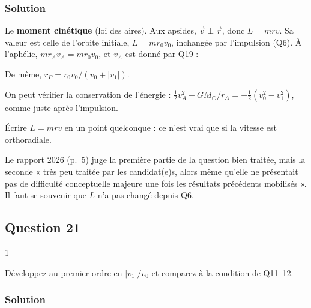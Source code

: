\documentclass[11pt,a4paper]{article}
\newcommand{\equationajustee}[1]{%
  \sbox{\boiteequation}{$\displaystyle #1$}%
  \ifdim\wd\boiteequation>\linewidth
    \[\resizebox{\linewidth}{!}{\usebox{\boiteequation}}\]%
  \else
    \[#1\]%
  \fi}
\begin{document}
\hypertarget{solution-19}{%
\subsubsection{Solution}\label{solution-19}}

Le \textbf{moment cinétique} (loi des aires). Aux apsides, \(\vec v\perp\vec r\), donc \(L=mrv\). Sa valeur est celle de l'orbite initiale, \(L=mr_0v_0\), inchangée par l'impulsion (Q6). À l'aphélie, \(mr_Av_A=mr_0v_0\), et \(v_A\) est donné par Q19 :

\equationajustee{\boxed{r_A=\frac{r_0v_0}{v_0-|v_1|}}}

De même, \(r_P=r_0v_0/(v_0+|v_1|)\).

On peut vérifier la conservation de l'énergie : \(\frac12v_A^2-GM_\odot/r_A=-\frac12(v_0^2-v_1^2)\), comme juste après l'impulsion.

\begin{piege}

Écrire \(L=mrv\) en un point quelconque : ce n'est vrai que si la vitesse est orthoradiale.

\end{piege}

\begin{jury}

Le rapport 2026 (p.~5) juge la première partie de la question bien traitée, mais la seconde « très peu traitée par les candidat(e)s, alors même qu'elle ne présentait pas de difficulté conceptuelle majeure une fois les résultats précédents mobilisés ». Il faut se souvenir que \(L\) n'a pas changé depuis Q6.

\end{jury}

\hypertarget{question-21}{%
\subsection{Question 21}\label{question-21}}

\begin{indication}{1}

Développez au premier ordre en \(|v_1|/v_0\) et comparez à la condition de Q11--12.

\end{indication}

\hypertarget{solution-20}{%
\subsubsection{Solution}\label{solution-20}}
\end{document}
